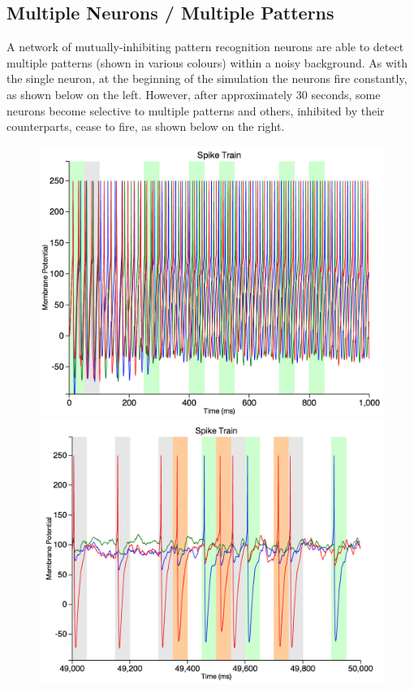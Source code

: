\documentclass[a4paper,11pt]{article}
\begin{document}
\begin{appendices}
\newpage

\subsection{Multiple Neurons / Multiple Patterns}
A network of mutually-inhibiting pattern recognition neurons are able to detect multiple patterns (shown in various colours) within a noisy background. As with the single neuron, at the beginning of the simulation the neurons fire constantly, as shown below on the left. However, after approximately 30 seconds, some neurons become selective to multiple patterns and others, inhibited by their counterparts, cease to fire, as shown below on the right.

\begin{figure}[h]
\centering
\includegraphics[scale = 0.3]{multiple_beginning}
\includegraphics[scale = 0.3]{multiple_end}
\end{figure}


\end{appendices}
\end{document}
